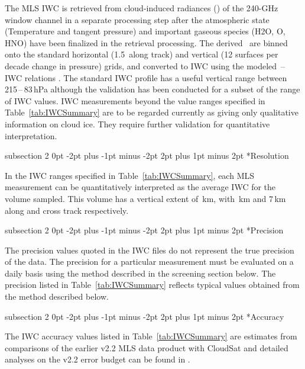 \documentclass[11pt,draft]{report}
\makeatletter
\renewcommand{\subsection}{\@startsection%
  {subsection}%
  {2}%
  {0pt}%
  {-2pt plus -1pt minus -2pt}%
  {2pt plus 1pt minus 2pt}%
  {\large\sffamily\fontseries{sb}\selectfont\flushleft\color{SectionColor}\figureversion{tabular}}}%
\makeatother
\begin{document}
The MLS IWC is retrieved from cloud-induced radiances (\Tcir) of the
240-GHz window channel in a separate processing step after the
atmospheric state (Temperature and tangent pressure) and important
gaseous species (H\cs2O, O, HNO) have been finalized in the
retrieval processing.  The derived \Tcir\ are binned onto the standard
horizontal (1.5\degsym\ along track) and vertical (12 surfaces per
decade change in pressure) grids, and converted to IWC using the modeled
\Tcir\,--\,IWC relations \citep{WuEtal06}.  The standard IWC profile has
a useful vertical range between 215\,--\,83\,hPa although the validation
has been conducted for a subset of the range of IWC values. IWC
measurements beyond the value ranges specified in
Table~\ref{tab:IWCSummary} are to be regarded currently as giving only
qualitative information on cloud ice.  They require further validation
for quantitative interpretation.

\subsection*{Resolution}

In the IWC ranges specified in Table~\ref{tab:IWCSummary}, each MLS
measurement can be quantitatively interpreted as the average IWC for the
volume sampled. This volume has a vertical extent of \,km, with
\,km and 7\,km along and cross track respectively.

\subsection*{Precision}

The precision values quoted in the IWC files do not represent the true
precision of the data.  The precision for a particular measurement must
be evaluated on a daily basis using the method described in the
screening section below.  The precision listed in
Table~\ref{tab:IWCSummary} reflects typical values obtained from the
method described below.

\subsection*{Accuracy}

The IWC accuracy values listed in Table~\ref{tab:IWCSummary} are
estimates from comparisons of the earlier v2.2 MLS data product with
CloudSat and detailed analyses on the v2.2 error budget can be found in
\citet{WuEtal08}.
\end{document}

